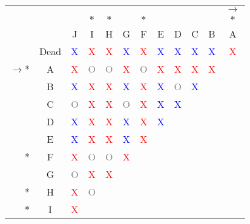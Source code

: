 \begin{tabular}[c]{rccccccccccc}

                  &      &   &   &   &   &   &   &   &   &   & $\rightarrow$ \\
                  &      &   &$*$&$*$&   &$*$&   &   &   &   & $*$ \\
                  &      & J & I & H & G & F & E & D & C & B & A \\
                  & Dead & \textcolor{blue}{X} & \textcolor{red}{X} & \textcolor{red}{X} & \textcolor{blue}{X} & \textcolor{red}{X} & \textcolor{blue}{X} & \textcolor{blue}{X} & \textcolor{blue}{X} & \textcolor{blue}{X} & \textcolor{red}{X} \\
  $\rightarrow*$  & A    & \textcolor{red}{X} & \textcolor{gray}{O} & \textcolor{gray}{O} & \textcolor{red}{X} & \textcolor{gray}{O} & \textcolor{red}{X} & \textcolor{red}{X} & \textcolor{red}{X} & \textcolor{red}{X} &   \\
                  & B    & \textcolor{blue}{X} & \textcolor{red}{X} & \textcolor{red}{X} & \textcolor{blue}{X} & \textcolor{red}{X} & \textcolor{blue}{X} & \textcolor{gray}{O} & \textcolor{blue}{X} &   &   \\
                  & C    & \textcolor{gray}{O} & \textcolor{red}{X} & \textcolor{red}{X} & \textcolor{gray}{O} & \textcolor{red}{X} & \textcolor{blue}{X} & \textcolor{blue}{X} &   &   &   \\
                  & D    & \textcolor{blue}{X} & \textcolor{red}{X} & \textcolor{red}{X} & \textcolor{blue}{X} & \textcolor{red}{X} & \textcolor{blue}{X} &   &   &   &   \\
                  & E    & \textcolor{blue}{X} & \textcolor{red}{X} & \textcolor{red}{X} & \textcolor{blue}{X} & \textcolor{red}{X} &   &   &   &   &   \\
             $*$  & F    & \textcolor{red}{X} & \textcolor{gray}{O} & \textcolor{gray}{O} & \textcolor{red}{X} &   &   &   &   &   &   \\
                  & G    & \textcolor{gray}{O} & \textcolor{red}{X} & \textcolor{red}{X} &   &   &   &   &   &   &   \\
             $*$  & H    & \textcolor{red}{X} & \textcolor{gray}{O} &   &   &   &   &   &   &   &   \\
             $*$  & I    & \textcolor{red}{X} &   &   &   &   &   &   &   &   &   \\
\end{tabular}
